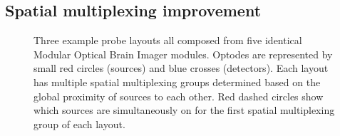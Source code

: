 \subsection{Spatial multiplexing improvement}
    \begin{figure}%
    	\begin{center}
     
    	\end{center}
    	\caption{Three example probe layouts all composed from five identical Modular Optical Brain Imager modules. Optodes are represented by small red circles (sources) and blue crosses (detectors). Each layout has multiple spatial multiplexing groups determined based on the global proximity of sources to each other. Red dashed circles show which sources are simultaneously on for the first spatial multiplexing group of each layout.} 
    	\label{fig:layouts}
    \end{figure} 
    
